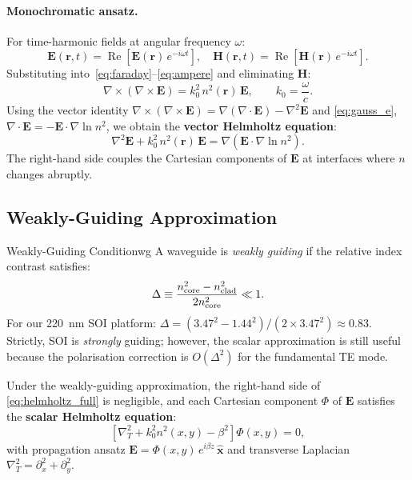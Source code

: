 \documentclass[12pt, a4paper]{article}
\begin{document}
\paragraph{Monochromatic ansatz.}
For time-harmonic fields at angular frequency $\omega$:
\begin{equation}
  \mathbf{E}(\mathbf{r},t) = \operatorname{Re}\!\left[\mathbf{E}(\mathbf{r})\,
  e^{-i\omega t}\right], \quad
  \mathbf{H}(\mathbf{r},t) = \operatorname{Re}\!\left[\mathbf{H}(\mathbf{r})\,
  e^{-i\omega t}\right].
\end{equation}
Substituting into~\eqref{eq:faraday}--\eqref{eq:ampere} and eliminating
$\mathbf{H}$:
\begin{equation}
  \nabla \times (\nabla \times \mathbf{E})
  = k_0^2\, n^2(\mathbf{r})\, \mathbf{E},
  \qquad k_0 = \frac{\omega}{c}.
\end{equation}
Using the vector identity $\nabla\times(\nabla\times\mathbf{E})
= \nabla(\nabla\cdot\mathbf{E}) - \nabla^2\mathbf{E}$
and \eqref{eq:gauss_e}, $\nabla\cdot\mathbf{E} = -\mathbf{E}\cdot\nabla\ln n^2$,
we obtain the \textbf{vector Helmholtz equation}:
\begin{equation}
  \nabla^2 \mathbf{E} + k_0^2\, n^2(\mathbf{r})\, \mathbf{E}
  = \nabla\!\left(\mathbf{E}\cdot\nabla\ln n^2\right).
  \label{eq:helmholtz_full}
\end{equation}
The right-hand side couples the Cartesian components of $\mathbf{E}$ at
interfaces where $n$ changes abruptly.

\subsection{Weakly-Guiding Approximation}

\begin{definition}{Weakly-Guiding Condition}{wg}
  A waveguide is \emph{weakly guiding} if the relative index contrast satisfies:
  \begin{equation}
    \Delta \equiv \frac{n_{\rm core}^2 - n_{\rm clad}^2}{2 n_{\rm core}^2} \ll 1.
    \label{eq:delta}
  \end{equation}
  For our \SI{220}{\nano\metre} SOI platform:
  $\Delta = (3.47^2 - 1.44^2)/(2\times3.47^2) \approx 0.83$.
  Strictly, SOI is \emph{strongly} guiding; however, the scalar
  approximation is still useful because the polarisation correction
  is $O(\Delta^2)$ for the fundamental TE mode.
\end{definition}

Under the weakly-guiding approximation, the right-hand side of
\eqref{eq:helmholtz_full} is negligible, and each Cartesian component
$\Phi$ of $\mathbf{E}$ satisfies the \textbf{scalar Helmholtz equation}:
\begin{equation}
  \left[\nabla_T^2 + k_0^2 n^2(x,y) - \beta^2\right]\Phi(x,y) = 0,
  \label{eq:scalar_helmholtz}
\end{equation}
with propagation ansatz $\mathbf{E} = \Phi(x,y)\,e^{i\beta z}\,\hat{\mathbf{x}}$
and transverse Laplacian $\nabla_T^2 = \partial_x^2 + \partial_y^2$.
\end{document}
